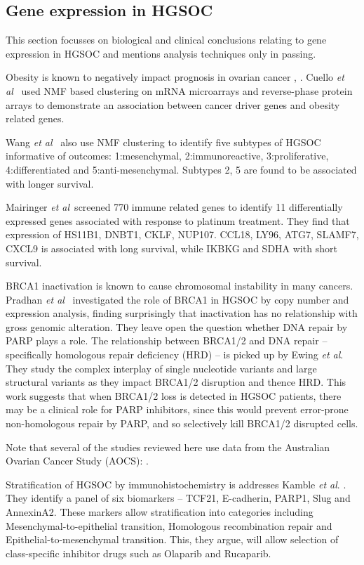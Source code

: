 \documentclass[tikz, 12pt,a4paper,oneside,fleqn]{article}
\newcommand{\etal}{{\em et al\/}}
\begin{document}
\subsection{Gene expression in HGSOC}

This section focusses on biological and clinical conclusions relating to gene expression in HGSOC and mentions analysis techniques only in passing.

Obesity is known to negatively impact prognosis in ovarian cancer \cite{Cuello2018}, \cite{Au-Yeung2014}.  Cuello \etal\ \cite{Cuello2018} used NMF based clustering on mRNA microarrays and reverse-phase protein arrays to demonstrate an association between cancer driver genes and obesity related genes.

Wang \etal\ \cite{Wang2017c} also use NMF clustering to identify five subtypes of HGSOC informative of outcomes: 1:mesenchymal, 2:immunoreactive, 3:proliferative, 4:differentiated and 5:anti-mesenchymal.  Subtypes 2, 5 are found to be associated with longer survival.

Mairinger \etal\ screened 770 immune related genes to identify 11 differentially expressed genes associated with response to platinum treatment.  They find that expression of HS11B1, DNBT1, CKLF, NUP107. CCL18, LY96, ATG7, SLAMF7, CXCL9 is associated with long survival, while IKBKG and SDHA with short survival.

BRCA1 inactivation is known to cause chromosomal instability in many cancers.  Pradhan \etal\ \cite{Pradhan2010} investigated the role of BRCA1 in HGSOC by copy number and expression analysis, finding surprisingly that inactivation has no relationship with gross genomic alteration.  They leave open the question whether DNA repair by PARP plays a role.   The relationship between BRCA1/2 and DNA repair -- specifically homologous repair deficiency (HRD) -- is picked up by Ewing \etal \cite{Ewing2020}.  They study the complex interplay of single nucleotide variants and large structural variants as they impact BRCA1/2 disruption and thence HRD.  This work suggests that when BRCA1/2 loss is detected in HGSOC patients, there may be a clinical role for PARP inhibitors, since this would prevent error-prone non-homologous repair by PARP, and so selectively kill BRCA1/2 disrupted cells.

Note that several of the studies reviewed here use data from the Australian Ovarian Cancer Study (AOCS): \cite{Winterhoff2016,Patch2015,Ewing2020,Zhang2018,Cuello2018,Au-Yeung2014}.

Stratification of HGSOC by immunohistochemistry is addresses Kamble \etal. \cite{Kamble2019}.  They identify a panel of six biomarkers -- TCF21, E-cadherin, PARP1, Slug and AnnexinA2.   These markers allow stratification into categories including Mesenchymal-to-epithelial transition, Homologous recombination repair and Epithelial-to-mesenchymal transition.  This, they argue, will allow selection of class-specific inhibitor drugs such as Olaparib and Rucaparib.
\end{document}
